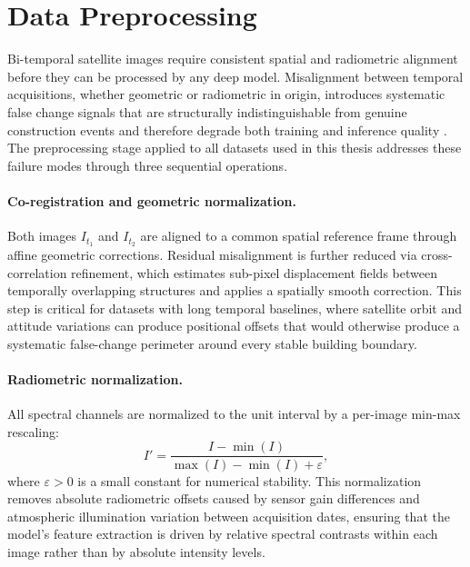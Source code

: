 \section{Data Preprocessing}
\label{sec:preprocessing}

Bi-temporal satellite images require consistent spatial and radiometric
alignment before they can be processed by any deep model. Misalignment
between temporal acquisitions, whether geometric or radiometric in origin,
introduces systematic false change signals that are structurally
indistinguishable from genuine construction events and therefore degrade
both training and inference quality \cite{Hussain2013Review}. The
preprocessing stage applied to all datasets used in this thesis addresses
these failure modes through three sequential operations.

\paragraph{Co-registration and geometric normalization.}
Both images $I_{t_1}$ and $I_{t_2}$ are aligned to a common spatial
reference frame through affine geometric corrections. Residual misalignment
is further reduced via cross-correlation refinement, which estimates
sub-pixel displacement fields between temporally overlapping structures and
applies a spatially smooth correction. This step is critical for datasets
with long temporal baselines, where satellite orbit and attitude variations
can produce positional offsets that would otherwise produce a systematic
false-change perimeter around every stable building boundary.

\paragraph{Radiometric normalization.}
All spectral channels are normalized to the unit interval by a per-image
min-max rescaling:
\begin{equation}
I' = \frac{I - \min(I)}{\max(I) - \min(I) + \varepsilon},
\label{eq:normalization}
\end{equation}
where $\varepsilon > 0$ is a small constant for numerical stability. This
normalization removes absolute radiometric offsets caused by sensor gain
differences and atmospheric illumination variation between acquisition dates,
ensuring that the model's feature extraction is driven by relative spectral
contrasts within each image rather than by absolute intensity levels.

